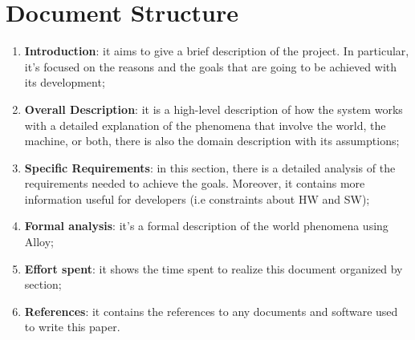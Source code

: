 \section{Document Structure}

\begin{enumerate}
    \item  \textbf{Introduction}: it aims to give a brief description of the project. In particular, it’s focused on the reasons and the goals that are going to be achieved with its development;
 
    \item \textbf{Overall Description}: it is a high-level description of how the system works with a detailed explanation of the phenomena that involve the world, the machine, or both, there is also the domain description with its assumptions;
 
    \item \textbf{Specific Requirements}: in this section, there is a detailed analysis of the requirements needed to achieve the goals. Moreover, it contains more information useful for developers (i.e constraints about HW and SW);
    
    \item \textbf{Formal analysis}: it’s a formal description of the world phenomena using Alloy;

    \item  \textbf{Effort spent}: it shows the time spent to realize this document organized by section;

    \item  \textbf{References}: it contains the references to any documents and software used to write this paper.
    
\end{enumerate}